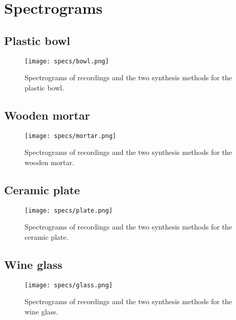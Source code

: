 \chapter{Spectrograms}\label{ap:spectrograms}
\section*{Plastic bowl}

\begin{figure}[H]
  \centering
    \texttt{[image: specs/bowl.png]}
      \caption{Spectrograms of recordings and the two synthesis methods for the plastic bowl.}
      \label{fig:sp_bowl}
\end{figure}

\newpage

\section*{Wooden mortar}

\begin{figure}[H]
  \centering
    \texttt{[image: specs/mortar.png]}
      \caption{Spectrograms of recordings and the two synthesis methods for the wooden mortar.}
      \label{fig:sp_mortar}
\end{figure}

\newpage

\section*{Ceramic plate}

\begin{figure}[H]
  \centering
    \texttt{[image: specs/plate.png]}
      \caption{Spectrograms of recordings and the two synthesis methods for the ceramic plate.}
      \label{fig:sp_plate}
\end{figure}

\newpage

\section*{Wine glass}

\begin{figure}[H]
  \centering
    \texttt{[image: specs/glass.png]}
      \caption{Spectrograms of recordings and the two synthesis methods for the wine glass.}
      \label{fig:sp_glass}
\end{figure}

